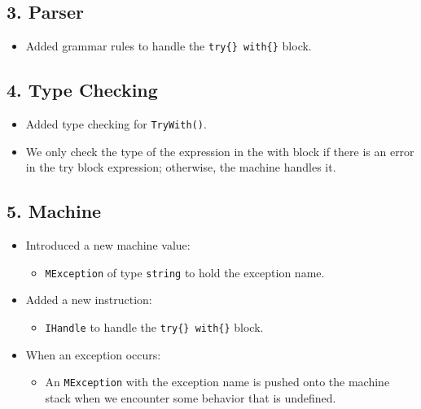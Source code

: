 \documentclass{article}
\begin{document}
\subsection*{3. Parser}
\begin{itemize}
    \item Added grammar rules to handle the \texttt{try\{\} with\{\}} block.
\end{itemize}

\subsection*{4. Type Checking}
\begin{itemize}
    \item Added type checking for \texttt{TryWith()}.
    \item We only check the type of the expression in the with block if there is an error in the try block expression; otherwise, the machine handles it.
\end{itemize}

\subsection*{5. Machine}
\begin{itemize}
    \item Introduced a new machine value:
    \begin{itemize}
        \item \texttt{MException} of type \texttt{string} to hold the exception name.
    \end{itemize}
    \item Added a new instruction:
    \begin{itemize}
        \item \texttt{IHandle} to handle the \texttt{try\{\} with\{\}} block.
    \end{itemize}
    \item When an exception occurs:
    \begin{itemize}
        \item An \texttt{MException} with the exception name is pushed onto the machine stack when we encounter some behavior that is undefined.
    \end{itemize}
\end{itemize}



\maketitle
\end{document}
